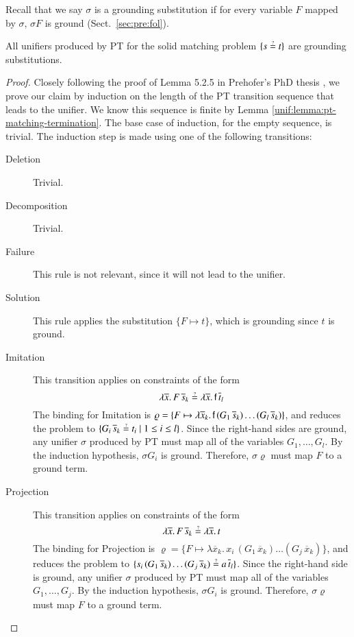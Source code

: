 Recall that we say $\sigma$ is a grounding substitution if for every variable $F$ mapped
by $\sigma$, $\sigma F$ is ground (Sect.~\ref{sec:pre:fol}).
\begin{lemma}
    \label{unif:lemma:pt-matching-ground}
  All unifiers produced by PT for the solid matching problem $\{s \unif t\}$ are grounding substitutions.
\end{lemma}
\begin{proof}
  Closely following the proof of Lemma 5.2.5 in Prehofer's PhD thesis
  \cite{cp-95-unifphd}, we prove our claim by induction on the length of the
  PT transition sequence that leads to the unifier. We know this
  sequence is finite by Lemma \ref{unif:lemma:pt-matching-termination}. The base case of
  induction, for the empty sequence, is trivial. The induction step is made using
  one of the following transitions:

  \begin{description}
    \item[Deletion] Trivial.
    \item[Decomposition] Trivial.
    \item[Failure] This rule is not relevant, since it will not lead to the unifier.
    \item[Solution] This rule applies the substitution $\{F \mapsto t\}$, which 
    is grounding since $t$ is ground.
    \item[Imitation] This transition applies on 
    constraints of the form
    \[ \lambda \overline{x}. \, F \, \overline{s}_k \unif \lambda
    \overline{x}. \, \cst{f} \, \overline{t}_l \]
    The binding for \textsf{Imitation} is
    $\varrho = \{F \mapsto \lambda \overline{x}_k.\, \mathsf{f}\, (G_1 \,
    \overline{s}_k ) \ldots (G_l \, \overline{s}_k ) \}$, and reduces the
    problem to $\{G_i \,  \overline{s}_k \unif t_i \mid 1\le i\le l\}$. Since the right-hand sides are ground, 
    any unifier $\sigma$ produced by PT must map all of the variables $G_1, \ldots, G_l$. By the induction hypothesis,
    $\sigma G_i$ is ground. Therefore, $\sigma\varrho$ must map $F$ to a ground term.
    \item[Projection] This transition applies on 
    constraints of the form 
    \[\lambda \overline{x}. \, F \, \overline{s}_k \unif \lambda
    \overline{x}. \, t\]
    The binding for \textsf{Projection} is
    $\varrho = \{F \mapsto \lambda \overline{x}_k. \, x_i \, (G_1 \,
      \overline{x}_k) \ldots (G_j \, \overline{x}_k)\}$,
    and reduces the problem to
    $\{s_i \, (G_1 \,
      \overline{s}_k) \ldots (G_j \, \overline{s}_k) \unif a \, \overline{t}_l\}$.
      Since the right-hand side is ground, 
      any unifier $\sigma$ produced by PT must map all of the variables $G_1, \ldots, G_j$. 
    By the induction hypothesis,
    $\sigma G_i$ is ground. Therefore, $\sigma\varrho$ must map $F$ to a ground term. \qedhere
  \end{description}
\end{proof}

